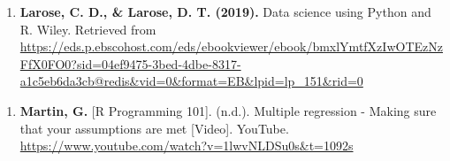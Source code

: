 \documentclass[
]{article}
\providecommand{\tightlist}{%
  \setlength{\itemsep}{0pt}\setlength{\parskip}{0pt}}
\begin{document}
\begin{enumerate}
\def\labelenumi{\arabic{enumi}.}
\setcounter{enumi}{6}
\tightlist
\item
  \textbf{Larose, C. D., \& Larose, D. T. (2019).} Data science using
  Python and R. Wiley. Retrieved from
  \url{https://eds.p.ebscohost.com/eds/ebookviewer/ebook/bmxlYmtfXzIwOTEzNzFfX0FO0?sid=04ef9475-3bed-4dbe-8317-a1c5eb6da3cb@redis&vid=0&format=EB&lpid=lp_151&rid=0}
\end{enumerate}

\begin{enumerate}
\def\labelenumi{\arabic{enumi}.}
\setcounter{enumi}{7}
\tightlist
\item
  \textbf{Martin, G.} {[}R Programming 101{]}. (n.d.). Multiple
  regression - Making sure that your assumptions are met {[}Video{]}.
  YouTube. \url{https://www.youtube.com/watch?v=1lwvNLDSu0s&t=1092s}
\end{enumerate}
\end{document}
